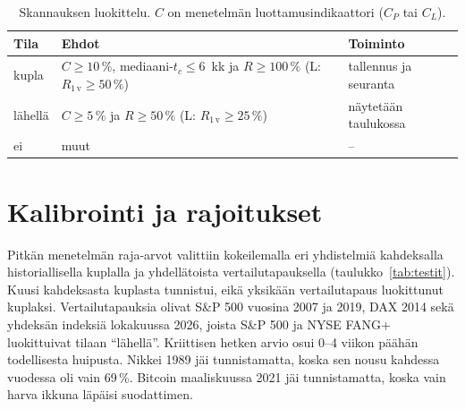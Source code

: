 \documentclass[10pt,a4paper]{article}
\newcommand{\tc}{t_c}
\begin{document}
\begin{table}[htbp]
  \centering\small
  \begin{tabularx}{\textwidth}{@{}l X l@{}}
    \toprule
    Tila & Ehdot & Toiminto \\
    \midrule
    kupla & $C \ge 10\,\%$, mediaani-$\tc \le 6$~kk ja $R \ge 100\,\%$ (L: $R_{1\,\mathrm{v}} \ge 50\,\%$) & tallennus ja seuranta \\
    lähellä & $C \ge 5\,\%$ ja $R \ge 50\,\%$ (L: $R_{1\,\mathrm{v}} \ge 25\,\%$) & näytetään taulukossa \\
    ei & muut & -- \\
    \bottomrule
  \end{tabularx}
  \caption{Skannauksen luokittelu. $C$ on menetelmän luottamusindikaattori ($C_P$ tai $C_L$).}
  \label{tab:luokat}
\end{table}

\section{Kalibrointi ja rajoitukset}\label{sec:kalibrointi}

Pitkän menetelmän raja-arvot valittiin kokeilemalla eri yhdistelmiä kahdeksalla historiallisella
kuplalla ja yhdellätoista vertailutapauksella (taulukko~\ref{tab:testit}). Kuusi kahdeksasta kuplasta
tunnistui, eikä yksikään vertailutapaus luokittunut kuplaksi. Vertailutapauksia olivat S\&P 500
vuosina 2007 ja 2019, DAX 2014 sekä yhdeksän indeksiä lokakuussa 2026, joista S\&P 500 ja NYSE
FANG+ luokittuivat tilaan \enquote{lähellä}. Kriittisen hetken arvio osui 0--4 viikon päähän
todellisesta huipusta. Nikkei 1989 jäi tunnistamatta, koska sen nousu kahdessa vuodessa oli vain
69\,\%. Bitcoin maaliskuussa 2021 jäi tunnistamatta, koska vain harva ikkuna läpäisi
suodattimen.
\end{document}
